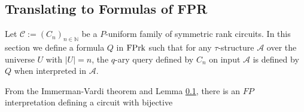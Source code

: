 \documentclass[../paper.tex]{subfiles}
\begin{document}
\subsection{Translating to Formulas of FPR}
Let $\mathcal{C}:= (C_n)_{n \in \mathbb{N}}$ be a $P$-uniform family of
symmetric rank circuits. In this section we define a formula $Q$ in $\text{\upshape FPrk}$ such
that for any $\tau$-structure $\mathcal{A}$ over the universe $U$ with $\vert U
\vert = n$, the $q$-ary query defined by $C_n$ on input $\mathcal{A}$ is defined
by $Q$ when interpreted in $\mathcal{A}$.

From the Immerman-Vardi theorem and Lemma \ref{}, there is an $FP$
interpretation defining a circuit with bijective 
\end{document}
